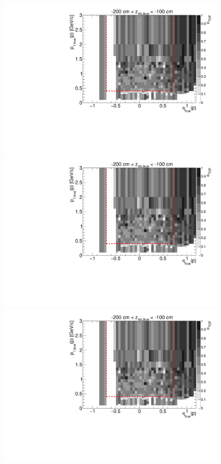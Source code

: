 \begin{figure}[hb]\ContinuedFloat
\centering
\parbox{0.495\textwidth}{
  \centering
  \includegraphics[width=\linewidth,page=11]{graphics/eff/Eff2D_TOF_proton_Minus.pdf}\\
  \includegraphics[width=\linewidth,page=13]{graphics/eff/Eff2D_TOF_proton_Minus.pdf}\\
  \includegraphics[width=\linewidth,page=15]{graphics/eff/Eff2D_TOF_proton_Minus.pdf}\\
}
\end{figure}
